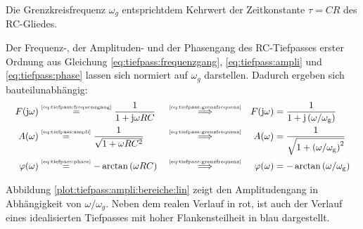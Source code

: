 \begin{frame}
{    Die Grenzkreisfrequenz $\omega_g$ entsprichtdem Kehrwert der Zeitkonstante $\tau = CR$ des RC-Gliedes.

    Der Frequenz-, der Amplituden- und der Phasengang des RC-Tiefpasses erster Ordnung aus Gleichung 
    \ref{eq:tiefpass:frequenzgang}, \ref{eq:tiefpass:ampli} und \ref{eq:tiefpass:phase}
    lassen sich normiert auf $\omega_g$ darstellen. Dadurch ergeben sich bauteilunabhängig:
    \begin{align}
        &&F(\mathrm{j}\omega) &\overset{\text{\tiny{\ref{eq:tiefpass:frequenzgang}}}}{=} \frac{1}{1+\mathrm{j}\omega RC} &  
            &\overset{\text{\tiny{\ref{eq:tiefpass:grenzfrequenz}}}}{\Longrightarrow}&
            F(\mathrm{j}\omega) &= \frac{1}{1+\mathrm{j}\left(\omega/\omega_{\mathrm{g}}\right)} &&\label{eq:tiefpass:normiert:frequenzgang}\\
        &&A(\omega) &\overset{\text{\tiny{\ref{eq:tiefpass:ampli}}}}{=} \frac{1}{\sqrt{1 + \omega RC^2 }} & 
            &\overset{\text{\tiny{\ref{eq:tiefpass:grenzfrequenz}}}}{\Longrightarrow}&
            A(\omega) &= \frac{1}{\sqrt{1 + \left(\omega/\omega_{\mathrm{g}}\right)^2 }} \label{eq:tiefpass:normiert:amplitudengang}\\
        &&\varphi(\omega) &\overset{\text{\tiny{\ref{eq:tiefpass:phase}}}}{=} -\arctan\left(\omega RC\right) &  
            &\overset{\text{\tiny{\ref{eq:tiefpass:grenzfrequenz}}}}{\Longrightarrow}&
            \varphi(\omega) &= -\arctan\left(\omega/\omega_{\mathrm{g}}\right) \label{eq:tiefpass:normiert:phasengang}
    \end{align}

    Abbildung \ref{plot:tiefpass:ampli:bereiche:lin} zeigt den Amplitudengang in Abhängigkeit von $\omega/\omega_g$.
    Neben dem realen Verlauf in rot, ist auch der Verlauf eines idealisierten Tiefpasses mit hoher Flankensteilheit in blau dargestellt.

}
\end{frame}
